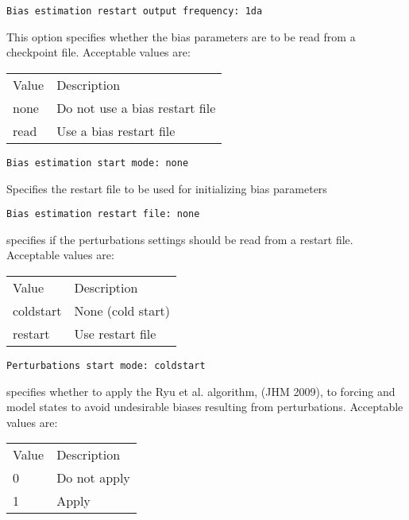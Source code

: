  \begin{Verbatim}[frame=single]
Bias estimation restart output frequency: 1da
 \end{Verbatim}

 
  This option specifies whether the
 bias parameters are to be read from a checkpoint file. 
 Acceptable values are:

 \begin{tabular}{ll}
 Value & Description                    \\
 none  & Do not use a bias restart file \\
 read  & Use a bias restart file        \\
 \end{tabular}
 

 \begin{Verbatim}[frame=single]
Bias estimation start mode: none
 \end{Verbatim}

 
  Specifies the restart file to be
 used for initializing bias parameters 
 

 \begin{Verbatim}[frame=single]
Bias estimation restart file: none
 \end{Verbatim}

 
  specifies if the perturbations settings
 should be read from a restart file.
 Acceptable values are: 

 \begin{tabular}{ll}
 Value     & Description       \\
 coldstart & None (cold start) \\
 restart   & Use restart file  \\
 \end{tabular}
 

 \begin{Verbatim}[frame=single]
Perturbations start mode: coldstart
 \end{Verbatim}

 
  specifies whether
 to apply the Ryu et al. algorithm, (JHM 2009), to forcing and
 model states to avoid undesirable biases resulting from perturbations.
 Acceptable values are: 

 \begin{tabular}{ll}
 Value & Description  \\
 0     & Do not apply \\
 1     & Apply        \\
 \end{tabular}
 

